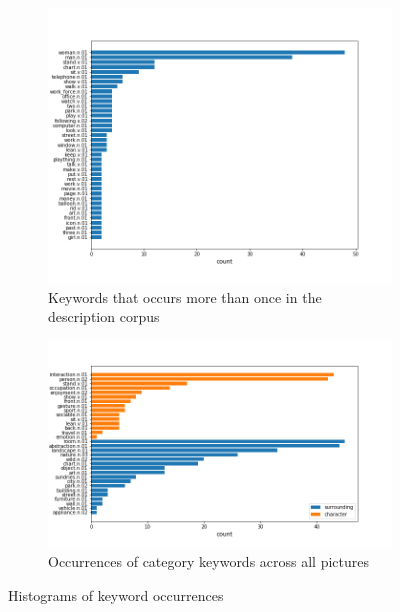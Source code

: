 \documentclass{article} %
\begin{document}
\begin{figure}[htbp]
  	\centering
	\begin{subfigure}{.42\linewidth}
	\centering
	\includegraphics[width=\linewidth]{../results/text-occurrence}
	\caption{Keywords that occurs more than once in the description corpus}
	\label{fig: text-occurrence}
	\end{subfigure}
	\begin{subfigure}{.57\linewidth}
	\centering
	\includegraphics[width=\linewidth]{../results/picture-occurrence}
	\caption{Occurrences of category keywords across all pictures}
	\label{fig: picture-occurrence}
	\end{subfigure}
	\caption{Histograms of keyword occurrences}
\end{figure}
\end{document}

